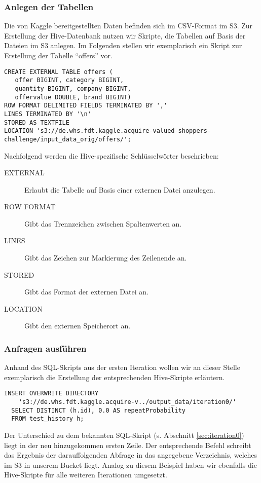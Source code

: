 \subsubsection{Anlegen der Tabellen}
Die von Kaggle bereitgestellten Daten befinden sich im CSV-Format im S3.
Zur Erstellung der Hive-Datenbank nutzen wir Skripte, die Tabellen auf Basis der Dateien im S3 anlegen. Im Folgenden stellen wir exemplarisch ein Skript zur Erstellung der Tabelle "`offers"' vor. 
\\
\begin{lstlisting}[style=hive]
CREATE EXTERNAL TABLE offers (
   offer BIGINT, category BIGINT, 
   quantity BIGINT, company BIGINT, 
   offervalue DOUBLE, brand BIGINT)
ROW FORMAT DELIMITED FIELDS TERMINATED BY ','
LINES TERMINATED BY '\n'
STORED AS TEXTFILE
LOCATION 's3://de.whs.fdt.kaggle.acquire-valued-shoppers- challenge/input_data_orig/offers/';
\end{lstlisting}

Nachfolgend werden die Hive-spezifische Schlüsselwörter beschrieben:
\begin{description}
\item[EXTERNAL] Erlaubt die Tabelle auf Basis einer externen Datei anzulegen.
\item[ROW FORMAT] Gibt das Trennzeichen zwischen Spaltenwerten an.
\item[LINES] Gibt das Zeichen zur Markierung des Zeilenende an.
\item[STORED] Gibt das Format der externen Datei an.
\item[LOCATION] Gibt den externen Speicherort an.
\end{description}

\subsubsection{Anfragen ausführen}
Anhand des SQL-Skripts aus der ersten Iteration wollen wir an dieser Stelle exemplarisch die Erstellung der entsprechenden Hive-Skripte erläutern.

\begin{lstlisting}[style=hive]
INSERT OVERWRITE DIRECTORY
    's3://de.whs.fdt.kaggle.acquire-v../output_data/iteration0/'
  SELECT DISTINCT (h.id), 0.0 AS repeatProbability
  FROM test_history h;
\end{lstlisting}

Der Unterschied zu dem bekannten SQL-Skript (s. Abschnitt \ref{sec:iteration0}) liegt in der neu hinzugekommen ersten Zeile. Der entsprechende Befehl schreibt das Ergebnis der darauffolgenden Abfrage in das angegebene Verzeichnis, welches im S3 in unserem Bucket liegt. Analog zu diesem Beispiel haben wir ebenfalls die Hive-Skripte für alle weiteren Iterationen umgesetzt.

  

